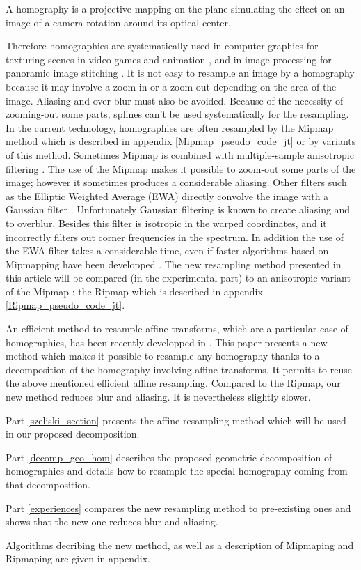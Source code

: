
A homography is a projective mapping on the plane simulating the effect  on an image of a camera rotation around its optical center. 



Therefore homographies are systematically used in computer graphics for texturing scenes in video games and animation \cite{heckbert1983texture}, and in image  processing for panoramic image stitching \cite{brown2007automatic}. It is not easy to resample an image by a homography because it may involve a zoom-in or a zoom-out depending on the area of the image. Aliasing and over-blur must also be avoided. Because of the necessity of zooming-out some parts, splines can't be used systematically for the resampling. In the current technology, homographies are often resampled by the Mipmap method \cite{williams1983pyramidal} which is described in appendix \ref{Mipmap_pseudo_code_jt} or by variants of this method. Sometimes Mipmap is combined with multiple-sample anisotropic filtering  \cite{barkans1997high}. The use of the Mipmap makes it possible to zoom-out some parts of the image; however it sometimes produces a considerable aliasing. Other filters such as the Elliptic Weighted Average (EWA) directly convolve the image with a Gaussian filter \cite{greene1986creating}. Unfortunately Gaussian filtering is known to create aliasing and to overblur. Besides this filter is isotropic in the warped coordinates, and it incorrectly filters out corner frequencies in the spectrum. In addition the use of the EWA filter takes a considerable time, even if faster algorithms based on Mipmapping have been developped \cite{mccormack1999feline,huttner1999fast}. The new resampling method presented in this article will be compared (in the experimental part) to an anisotropic variant of the Mipmap : the Ripmap \cite{akenine2008real} which is described in appendix \ref{Ripmap_pseudo_code_jt}.

	An efficient method to resample affine transforms, which are a particular case of homographies, has been recently developped in \cite{szeliski2010high}. This paper presents a new method which makes it possible to resample any homography thanks to a decomposition of the homography involving affine transforms. It permits to reuse the above mentioned efficient affine resampling. Compared to the Ripmap, our new method reduces blur and aliasing. It is nevertheless slightly slower.
	
	Part \ref{szeliski_section} presents the affine resampling method which will be used in our  proposed decomposition.
		
	Part \ref{decomp_geo_hom} describes the proposed geometric decomposition of homographies and details how to resample the special homography coming from that decomposition.
	
	Part \ref{experiences} compares the new resampling method to pre-existing ones and shows that the new one reduces blur and aliasing.
	
	Algorithms decribing the new method, as well as a description of Mipmaping and Ripmaping are given in appendix.	
